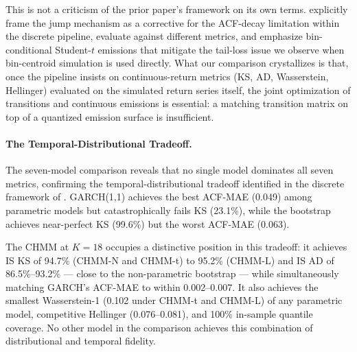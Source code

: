 This is not a criticism of the prior paper's framework on its own terms.
\citet{alswaidan2026hybrid} explicitly frame the jump mechanism as a corrective for the ACF-decay limitation within the discrete pipeline, evaluate against different metrics, and emphasize bin-conditional Student-$t$ emissions that mitigate the tail-loss issue we observe when bin-centroid simulation is used directly.
What our comparison crystallizes is that, once the pipeline insists on continuous-return metrics (KS, AD, Wasserstein, Hellinger) evaluated on the simulated return series itself, the joint optimization of transitions and continuous emissions is essential: a matching transition matrix on top of a quantized emission surface is insufficient.

\paragraph{The Temporal-Distributional Tradeoff.}
The seven-model comparison reveals that no single model dominates all seven metrics, confirming the temporal-distributional tradeoff identified in the discrete framework of \citet{alswaidan2026hybrid}.
GARCH(1,1) achieves the best ACF-MAE (0.049) among parametric models but catastrophically fails KS (23.1\%), while the bootstrap achieves near-perfect KS (99.6\%) but the worst ACF-MAE (0.063).

The CHMM at $K = 18$ occupies a distinctive position in this tradeoff: it achieves IS KS of 94.7\% (CHMM-N and CHMM-t) to 95.2\% (CHMM-L) and IS AD of 86.5\%--93.2\% --- close to the non-parametric bootstrap --- while simultaneously matching GARCH's ACF-MAE to within 0.002--0.007.
It also achieves the smallest Wasserstein-1 (0.102 under CHMM-t and CHMM-L) of any parametric model, competitive Hellinger (0.076--0.081), and 100\% in-sample quantile coverage.
No other model in the comparison achieves this combination of distributional and temporal fidelity.

